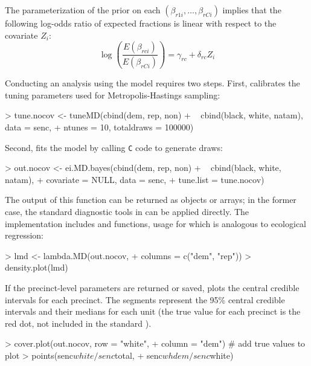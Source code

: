 The parameterization of the prior on each $(\beta_{r1i}, \dots,
\beta_{rCi})$ implies that the following log-odds ratio of expected
fractions is linear with respect to the covariate $Z_i$:
\begin{displaymath}
\log\left( \frac{E(\beta_{rci})}{E(\beta_{rCi})} \right) = \gamma_{rc}
+ \delta_{rc} Z_i
\end{displaymath}


Conducting an analysis using the  model requires two steps.  First,
 calibrates the tuning parameters used for
Metropolis-Hastings sampling:
\begin{smallexample}
> tune.nocov <- tuneMD(cbind(dem, rep, non) 
+   ~ cbind(black, white, natam), data = senc, 
+   ntunes = 10, totaldraws = 100000)
\end{smallexample}
\noindent Second,  fits the model by calling
\texttt{C} code to generate  draws:
\begin{smallexample}
> out.nocov <- ei.MD.bayes(cbind(dem, rep, non) 
+   ~ cbind(black, white, natam),
+   covariate = NULL, data = senc, 
+   tune.list = tune.nocov)
\end{smallexample}
The output of this function can be returned as  objects
or arrays; in the former case, the standard diagnostic tools in
 \citep{PlummerEtal06} can be applied directly.   The  implementation includes  and 
functions, usage for which is analogous to ecological regression:
\begin{smallexample}
> lmd <- lambda.MD(out.nocov, 
+   columns = c("dem", "rep"))
> density.plot(lmd)
\end{smallexample}
If the precinct-level parameters are returned or saved,
 plots the central credible intervals for each
precinct.  The segments represent the 95\% central credible intervals
and their medians for each unit (the true value for each precinct is
the red dot, not included in the standard ).
\begin{smallexample}
> cover.plot(out.nocov, row = "white", 
+   column = "dem")
# add true values to plot
> points(senc$white/senc$total, 
+   senc$whdem/senc$white)
\end{smallexample}

